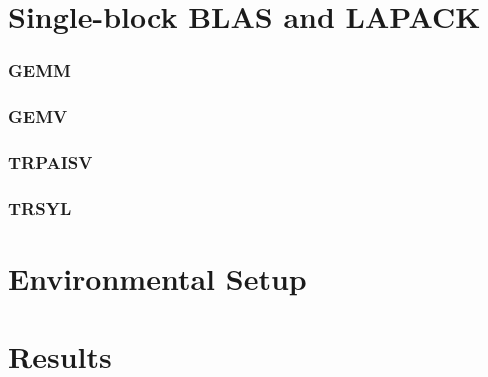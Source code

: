 \documentclass[../thesis]{subfiles}
\begin{document}
	\section{Single-block BLAS and LAPACK}
		\subsubsection{GEMM}
		\subsubsection{GEMV}
		\subsubsection{TRPAISV}
		\subsubsection{TRSYL}

	\section{Environmental Setup}
	\section{Results}
\end{document}
